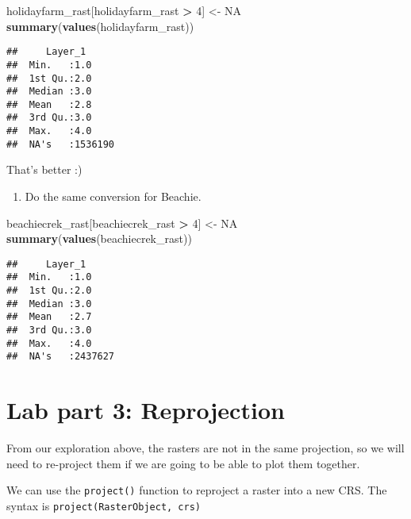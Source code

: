 \documentclass[
]{article}
\newenvironment{Shaded}{\begin{snugshade}}{\end{snugshade}}
\newcommand{\ConstantTok}[1]{\textcolor[rgb]{0.56,0.35,0.01}{#1}}
\newcommand{\DecValTok}[1]{\textcolor[rgb]{0.00,0.00,0.81}{#1}}
\newcommand{\FunctionTok}[1]{\textcolor[rgb]{0.13,0.29,0.53}{\textbf{#1}}}
\newcommand{\NormalTok}[1]{#1}
\newcommand{\OtherTok}[1]{\textcolor[rgb]{0.56,0.35,0.01}{#1}}
\newcommand{\SpecialCharTok}[1]{\textcolor[rgb]{0.81,0.36,0.00}{\textbf{#1}}}
\providecommand{\tightlist}{%
  \setlength{\itemsep}{0pt}\setlength{\parskip}{0pt}}
\begin{document}
\begin{Shaded}
\begin{Highlighting}[]
\NormalTok{holidayfarm\_rast[holidayfarm\_rast }\SpecialCharTok{\textgreater{}} \DecValTok{4}\NormalTok{] }\OtherTok{\textless{}{-}} \ConstantTok{NA}
\FunctionTok{summary}\NormalTok{(}\FunctionTok{values}\NormalTok{(holidayfarm\_rast))}
\end{Highlighting}
\end{Shaded}

\begin{verbatim}
##     Layer_1       
##  Min.   :1.0      
##  1st Qu.:2.0      
##  Median :3.0      
##  Mean   :2.8      
##  3rd Qu.:3.0      
##  Max.   :4.0      
##  NA's   :1536190
\end{verbatim}

That's better :)

\begin{enumerate}
\def\labelenumi{\alph{enumi}.}
\setcounter{enumi}{3}
\tightlist
\item
  Do the same conversion for Beachie.
\end{enumerate}

\begin{Shaded}
\begin{Highlighting}[]
\NormalTok{beachiecrek\_rast[beachiecrek\_rast }\SpecialCharTok{\textgreater{}} \DecValTok{4}\NormalTok{] }\OtherTok{\textless{}{-}} \ConstantTok{NA}
\FunctionTok{summary}\NormalTok{(}\FunctionTok{values}\NormalTok{(beachiecrek\_rast))}
\end{Highlighting}
\end{Shaded}

\begin{verbatim}
##     Layer_1       
##  Min.   :1.0      
##  1st Qu.:2.0      
##  Median :3.0      
##  Mean   :2.7      
##  3rd Qu.:3.0      
##  Max.   :4.0      
##  NA's   :2437627
\end{verbatim}

\hypertarget{lab-part-3-reprojection}{%
\section{Lab part 3: Reprojection}\label{lab-part-3-reprojection}}

From our exploration above, the rasters are not in the same projection,
so we will need to re-project them if we are going to be able to plot
them together.

We can use the \texttt{project()} function to reproject a raster into a
new CRS. The syntax is \texttt{project(RasterObject,\ crs)}
\end{document}
